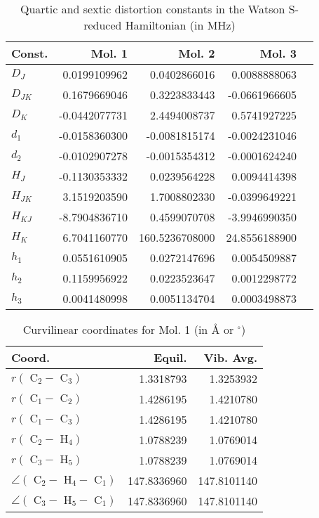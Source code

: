 \begin{table}
\centering
\caption{Quartic and sextic distortion constants in the Watson S-reduced Hamiltonian (in MHz)}
\begin{tabular}{lrrrr}
Const.        &             Mol. 1 &             Mol. 2 &             Mol. 3 \\
\hline
$D_{J}$       &       0.0199109962 &       0.0402866016 &       0.0088888063 \\
$D_{JK}$      &       0.1679669046 &       0.3223833443 &      -0.0661966605 \\
$D_{K}$       &      -0.0442077731 &       2.4494008737 &       0.5741927225 \\
$d_{1}$       &      -0.0158360300 &      -0.0081815174 &      -0.0024231046 \\
$d_{2}$       &      -0.0102907278 &      -0.0015354312 &      -0.0001624240 \\
\hline
$H_{J}$       &      -0.1130353332 &       0.0239564228 &       0.0094414398 \\
$H_{JK}$      &       3.1519203590 &       1.7008802330 &      -0.0399649221 \\
$H_{KJ}$      &      -8.7904836710 &       0.4599070708 &      -3.9946990350 \\
$H_{K}$       &       6.7041160770 &     160.5236708000 &      24.8556188900 \\
$h_{1}$       &       0.0551610905 &       0.0272147696 &       0.0054509887 \\
$h_{2}$       &       0.1159956922 &       0.0223523647 &       0.0012298772 \\
$h_{3}$       &       0.0041480998 &       0.0051134704 &       0.0003498873 \\
\end{tabular}
\end{table}
\begin{table}
\centering
\caption{Curvilinear coordinates for Mol. 1 (in \AA{} or $^\circ$)}
\begin{tabular}{lrr}
       Coord.         &             Equil. &          Vib. Avg. \\
\hline
$r(\text{ C}_{2 } - \text{ C}_{3 })$ &          1.3318793 &          1.3253932 \\
$r(\text{ C}_{1 } - \text{ C}_{2 })$ &          1.4286195 &          1.4210780 \\
$r(\text{ C}_{1 } - \text{ C}_{3 })$ &          1.4286195 &          1.4210780 \\
$r(\text{ C}_{2 } - \text{ H}_{4 })$ &          1.0788239 &          1.0769014 \\
$r(\text{ C}_{3 } - \text{ H}_{5 })$ &          1.0788239 &          1.0769014 \\
$\angle(\text{ C}_{2 } - \text{ H}_{4 } - \text{ C}_{1 })$ &        147.8336960 &        147.8101140 \\
$\angle(\text{ C}_{3 } - \text{ H}_{5 } - \text{ C}_{1 })$ &        147.8336960 &        147.8101140 \\
\end{tabular}
\end{table}

